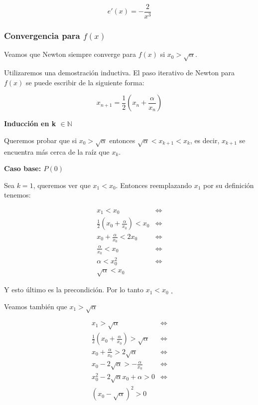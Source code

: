 \begin{equation}\label{e1_x}
    e'(x) = -\frac{2}{x^3}
\end{equation}


\subsubsection{Convergencia para $f(x)$}\label{sec:convergencia}

Veamos que Newton siempre converge para $f(x)$ si $x_0 > \sqrt{\alpha}$.

Utilizaremos una demostración inductiva. El paso iterativo de Newton para
$f(x)$ se puede escribir de la siguiente forma:

\[
    x_{n + 1} = \frac{ 1 }{ 2 } ( x_n + \frac{ \alpha }{ x_n })
\]

{\bf Inducción en k $\in \mathbb{N}$}

Queremos probar que si $x_0 > \sqrt{\alpha}$ entonces $\sqrt{\alpha} < x_{k + 1}
< x_k$, es decir, $x_{k + 1}$ se encuentra más cerca de la raíz que $x_k$.

{\bf Caso base: $P(0)$}

Sea $k = 1$, queremos ver que $x_1 < x_0$. Entonces reemplazando $x_1$ por su definición tenemos:

\begin{align*}
    x_1 < x_0 &\iff \\
    \frac{1}{2}(x_0 + \frac{\alpha}{x_0}) < x_0 &\iff \\
    x_0 + \frac{\alpha}{x_0} < 2x_0 &\iff \\
    \frac{\alpha}{x_0} < x_0 &\iff \\
    \alpha < x_0^2 &\iff \\
    \sqrt{\alpha} < x_0&
\end{align*}

Y esto último es la precondición. Por lo tanto $x_1 < x_0$ $_\square$

Veamos también que $x_1 > \sqrt{\alpha}$

\begin{align*}
    x_1 > \sqrt{\alpha} &\iff \\
    \frac{1}{2}(x_0 + \frac{\alpha}{x_0}) > \sqrt{\alpha} &\iff \\
    x_0 + \frac{\alpha}{x_0} > 2\sqrt{\alpha} &\iff \\
    x_0 - 2\sqrt{\alpha} > -\frac{\alpha}{x_0} &\iff \\
    x_0^2 - 2\sqrt{\alpha}x_0 + \alpha > 0 &\iff \\
    {(x_0 - \sqrt{\alpha})}^2 > 0
\end{align*}

